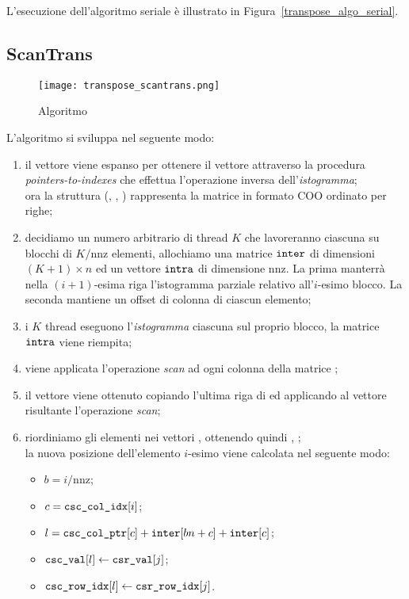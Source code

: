 L'esecuzione dell'algoritmo seriale è illustrato in Figura~\ref{transpose_algo_serial}.

\subsection{ScanTrans}

\begin{figure}[htbp]
    \centering
	\texttt{[image: transpose\_scantrans.png]}
	\caption{Algoritmo \ScanTrans}
	\label{transpose_algo_scantrans}
\end{figure}

L'algoritmo si sviluppa nel seguente modo:
\begin{enumerate}
    \item il vettore  viene espanso per ottenere il vettore  attraverso la procedura \emph{pointers-to-indexes} che effettua l'operazione inversa dell'\emph{istogramma}; \\
    ora la struttura (, , ) rappresenta la matrice in formato COO ordinato per righe;
    \item decidiamo un numero arbitrario di thread $K$ che lavoreranno ciascuna su blocchi di $K/\mathrm{nnz}$ elementi, allochiamo una matrice $\texttt{inter}$ di dimensioni $(K+1) \times n$ ed un vettore $\texttt{intra}$ di dimensione $\mathrm{nnz}$. La prima manterrà nella $(i+1)$-esima riga l'istogramma parziale relativo all'$i$-esimo blocco. La seconda mantiene un offset di colonna di ciascun elemento;
    \item i $K$ thread eseguono l'\emph{istogramma} ciascuna sul proprio blocco, la matrice $\texttt{intra}$ viene riempita;
    \item viene applicata l'operazione \emph{scan} ad ogni colonna della matrice ;
    \item il vettore  viene ottenuto copiando l'ultima riga di  ed applicando al vettore risultante l'operazione \emph{scan};
    \item riordiniamo gli elementi nei vettori ,  ottenendo quindi , ; \\
    la nuova posizione dell'elemento $i$-esimo viene calcolata nel seguente modo:
    \begin{itemize}
        \item $b = i / \mathrm{nnz}$;
        \item $c = \texttt{csc\_col\_idx}[i]$;
        \item $l = \texttt{csc\_col\_ptr}[c] + \texttt{inter}[b n + c] + \texttt{inter}[c]$;
        \item $\texttt{csc\_val}[l] \leftarrow \texttt{csr\_val}[j]$;
        \item $\texttt{csc\_row\_idx}[l] \leftarrow \texttt{csr\_row\_idx}[j]$.
    \end{itemize}
\end{enumerate}

